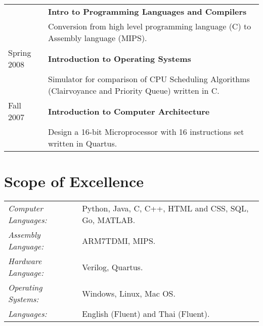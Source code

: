 \documentclass[11pt]{article}
\begin{document}
\begin{longtable}{l p{14cm}}
\begin{longtable}{lp{14cm}}
Fall 2008 & \textbf{Intro to Programming Languages and Compilers}\\
          & Conversion from high level programming language (C) to Assembly 
            language (MIPS).\\
Spring 2008 & \textbf{Introduction to Operating Systems}\\
            & Simulator for comparison of CPU Scheduling Algorithms (Clairvoyance 
              and Priority Queue) written in C.\\
Fall 2007 & \textbf{Introduction to Computer Architecture}\\
          & Design a 16-bit Microprocessor with 16 instructions set written in 
            Quartus.
\end{longtable}

\section{Scope of Excellence}
\noindent \begin{longtable}{lp{15cm}}
\textit{Computer Languages:} & Python, Java, C, C++, HTML and CSS, SQL, Go, MATLAB.\\
\textit{Assembly Language:}  & ARM7TDMI, MIPS. \\
\textit{Hardware Language:}  & Verilog, Quartus. \\
\textit{Operating Systems:}  & Windows, Linux, Mac OS. \\
\textit{Languages:}          & English (Fluent) and Thai (Fluent).\\
\end{longtable}
\end{document}
